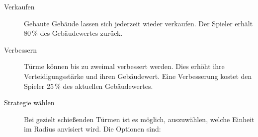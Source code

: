 \begin{description}
  \item[Verkaufen] Gebaute Gebäude lassen sich jederzeit wieder verkaufen. Der
    Spieler erhält 80\,\% des Gebäudewertes zurück.

  \item[Verbessern] Türme können bis zu zweimal verbessert werden. Dies erhöht
    ihre Verteidigungsstärke und ihren Gebäudewert. Eine Verbesserung kostet
    den Spieler 25\,\% des aktuellen Gebäudewertes.

  \item[Strategie wählen] Bei gezielt schießenden Türmen ist es möglich,
    auszuwählen, welche Einheit im Radius anvisiert wird. Die Optionen sind:
    
\end{description}
